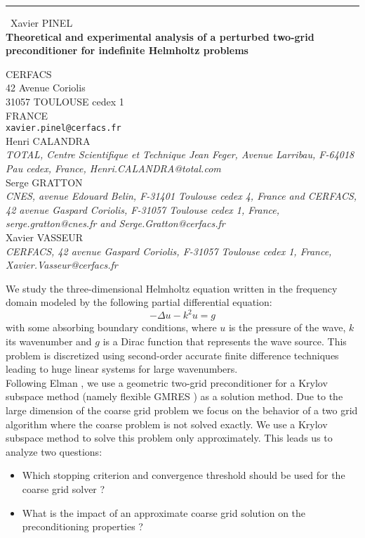 \documentclass{report}
\begin{document}
\begin{center}
\rule{6in}{1pt} \
{\large Xavier PINEL \\
{\bf Theoretical and experimental analysis of a perturbed two-grid preconditioner for indefinite Helmholtz problems}}

CERFACS \\ 42 Avenue Coriolis \\ 31057 TOULOUSE cedex 1 \\ FRANCE
\\
{\tt xavier.pinel@cerfacs.fr}\\
Henri CALANDRA\\
{\em TOTAL, Centre Scientifique et Technique Jean Feger, Avenue Larribau, F-64018 Pau cedex, France, Henri.CALANDRA@total.com}\\
Serge GRATTON\\
{\em CNES, avenue Edouard Belin, F-31401 Toulouse cedex 4, France and 
CERFACS, 42 avenue Gaspard Coriolis, F-31057 Toulouse cedex 1, France, serge.gratton@cnes.fr and Serge.Gratton@cerfacs.fr}\\
Xavier VASSEUR\\
{\em CERFACS, 42 avenue Gaspard Coriolis, F-31057 Toulouse cedex 1, France, Xavier.Vasseur@cerfacs.fr}\end{center}

We study the three-dimensional Helmholtz equation written in the
frequency domain modeled by the following partial differential equation:
$$
-\Delta u - k^2 u = g
$$
with some absorbing boundary conditions, where $u$ is the pressure of the
wave, $k$ its wavenumber and $g$ is a Dirac function that represents the
wave source. This problem is discretized using second-order accurate
finite difference techniques leading to huge linear systems for large
wavenumbers. \\

Following Elman \cite{Elman:2001}, we use a geometric two-grid
preconditioner for a Krylov subspace method (namely flexible GMRES
\cite{Saad:1993}) as a solution method. Due to the large dimension of the
coarse grid problem we focus on the behavior of a two grid algorithm
where the coarse problem is not solved exactly. We use a Krylov subspace
method to solve this problem only approximately. This leads us to analyze
two questions:
\begin{itemize}
\item Which stopping criterion and convergence threshold should be used
for the coarse grid solver ?
\item What is the impact of an approximate coarse grid solution on the
preconditioning properties ?
\end{itemize}
\end{document}
